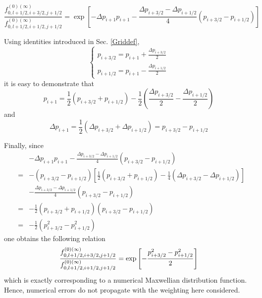 \begin{equation}
\frac{f_{0,l+1/2,i+3/2,j+1/2}^{\left( 0\right) (\infty )}}{
f_{0,l+1/2,i+1/2,j+1/2}^{\left( 0\right) (\infty )}}=\exp \left[ -\Delta
p_{i+1}p_{i+1}-\frac{\Delta p_{i+3/2}-\Delta p_{i+1/2}}{4}\left(
p_{i+3/2}-p_{i+1/2}\right) \right]
\end{equation}

Using identities introduced in Sec. \ref{Griddef},
\begin{equation}
\left\{
\begin{array}{l}
p_{i+3/2}=p_{i+1}+\frac{\Delta p_{i+3/2}}{2} \\
p_{i+1/2}=p_{i+1}-\frac{\Delta p_{i+1/2}}{2}
\end{array}
\right.
\end{equation}
it is easy to demonstrate that
\begin{equation}
p_{i+1}=\frac{1}{2}\left( p_{i+3/2}+p_{i+1/2}\right) -\frac{1}{2}\left(
\frac{\Delta p_{i+3/2}}{2}-\frac{\Delta p_{i+1/2}}{2}\right)
\end{equation}
and
\begin{equation}
\Delta p_{i+1}=\frac{1}{2}\left( \Delta p_{i+3/2}+\Delta p_{i+1/2}\right)
=p_{i+3/2}-p_{i+1/2}
\end{equation}

Finally, since
\begin{eqnarray}
&&-\Delta p_{i+1}p_{i+1}-\frac{\Delta p_{i+3/2}-\Delta p_{i+1/2}}{4}\left(
p_{i+3/2}-p_{i+1/2}\right)  \nonumber \\
&=&-\left( p_{i+3/2}-p_{i+1/2}\right) \left[ \frac{1}{2}\left(
p_{i+3/2}+p_{i+1/2}\right) -\frac{1}{4}\left( \Delta p_{i+3/2}-\Delta
p_{i+1/2}\right) \right]  \nonumber \\
&&-\frac{\Delta p_{i+3/2}-\Delta p_{i+1/2}}{4}\left(
p_{i+3/2}-p_{i+1/2}\right)  \nonumber \\
&=&-\frac{1}{2}\left( p_{i+3/2}+p_{i+1/2}\right) \left(
p_{i+3/2}-p_{i+1/2}\right)  \nonumber \\
&=&-\frac{1}{2}\left( p_{i+3/2}^{2}-p_{i+1/2}^{2}\right)
\end{eqnarray}
one obtains the following relation
\begin{equation}
\frac{f_{0,l+1/2,i+3/2,j+1/2}^{\left( 0\right) (\infty )}}{
f_{0,l+1/2,i+1/2,j+1/2}^{\left( 0\right) (\infty )}}=\exp \left[ -\frac{%
p_{i+3/2}^{2}-p_{i+1/2}^{2}}{2}\right]
\end{equation}
which is exactly corresponding to a numerical Maxwellian distribution
function. Hence, numerical errors do not propagate with the weighting here
considered.

